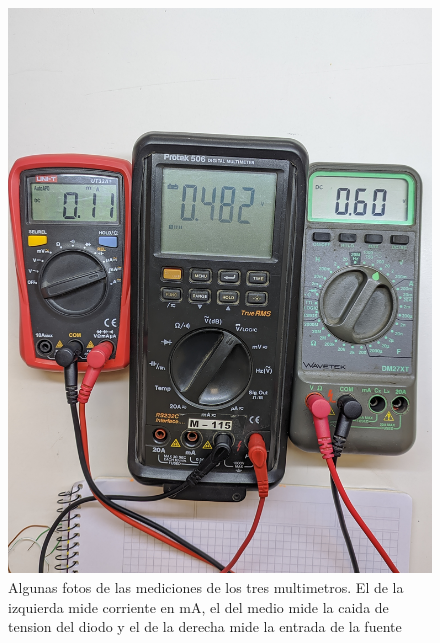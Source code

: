 \documentclass[chaptersright]{informeutn}
\begin{document}
\begin{figure}[!ht]
\begin{minipage}{0.25\textwidth}
          \includegraphics[width=1\textwidth]{pictures/mult_crkt-1_07.jpg}
        \end{minipage}
        \caption{Algunas fotos de las mediciones de los tres multimetros. El de la izquierda mide corriente en mA, el
        del medio mide la caida de tension del diodo y el de la derecha mide la entrada de la fuente}
      \end{figure}

      \begin{table}[H]
        \caption{Tabla de valores medidos del diodo de silicio.}
        \label{table.Si}
      \end{table}
\end{document}
